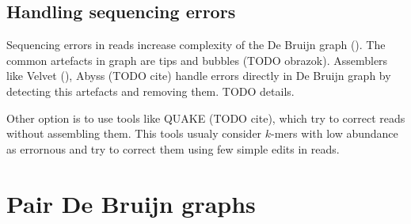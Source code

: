 \subsection{Handling sequencing errors}

Sequencing errors in reads increase complexity of the De Bruijn graph
(\cite{pevzner2001eulerian}). The common artefacts in graph are tips and bubbles
(TODO obrazok). Assemblers like Velvet (\cite{Velvet}), Abyss (TODO cite) handle
errors directly in De Bruijn graph by detecting this artefacts and removing them.
TODO details.

Other option is to use tools like QUAKE (TODO cite), which try to correct reads
without assembling them. This tools usualy consider $k$-mers with low abundance
as errornous and try to correct them using few simple edits in reads.


\section{Pair De Bruijn graphs}


